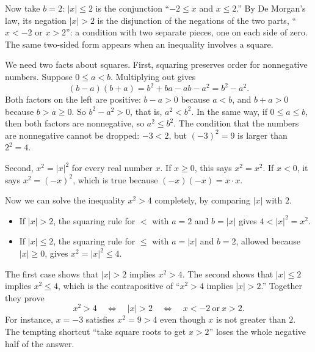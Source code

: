 Now take $b=2$: $|x|\le2$ is the conjunction ``$-2\le x$ and $x\le2$.'' By De Morgan's law, its negation $|x|>2$ is the disjunction of the negations of the two parts, ``$x<-2$ or $x>2$'': a condition with two separate pieces, one on each side of zero. The same two-sided form appears when an inequality involves a square.

We need two facts about squares. First, squaring preserves order for nonnegative numbers. Suppose $0\le a<b$. Multiplying out gives
\[
(b-a)(b+a)=b^2+ba-ab-a^2=b^2-a^2.
\]
Both factors on the left are positive: $b-a>0$ because $a<b$, and $b+a>0$ because $b>a\ge0$. So $b^2-a^2>0$, that is, $a^2<b^2$. In the same way, if $0\le a\le b$, then both factors are nonnegative, so $a^2\le b^2$. The condition that the numbers are nonnegative cannot be dropped: $-3<2$, but $(-3)^2=9$ is larger than $2^2=4$.

Second, $x^2=|x|^2$ for every real number $x$. If $x\ge0$, this says $x^2=x^2$. If $x<0$, it says $x^2=(-x)^2$, which is true because $(-x)(-x)=x\cdot x$.

Now we can solve the inequality $x^2>4$ completely, by comparing $|x|$ with $2$.
\begin{itemize}
\item If $|x|>2$, the squaring rule for $<$ with $a=2$ and $b=|x|$ gives $4<|x|^2=x^2$.
\item If $|x|\le2$, the squaring rule for $\le$ with $a=|x|$ and $b=2$, allowed because $|x|\ge0$, gives $x^2=|x|^2\le4$.
\end{itemize}
The first case shows that $|x|>2$ implies $x^2>4$. The second shows that $|x|\le2$ implies $x^2\le4$, which is the contrapositive of ``$x^2>4$ implies $|x|>2$.'' Together they prove
\[
x^2>4\quad\Longleftrightarrow\quad|x|>2\quad\Longleftrightarrow\quad x<-2\ \text{or}\ x>2.
\]
For instance, $x=-3$ satisfies $x^2=9>4$ even though $x$ is not greater than $2$. The tempting shortcut ``take square roots to get $x>2$'' loses the whole negative half of the answer.

